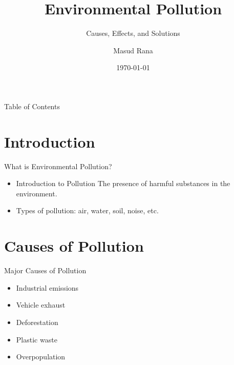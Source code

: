\documentclass{beamer}
\title{Environmental Pollution}
\subtitle{Causes, Effects, and Solutions}
\author{Masud Rana}
\date{\today}
\begin{document}
{
\begin{frame}
  \titlepage
\end{frame}
}


\begin{frame}{Table of Contents}
  \tableofcontents
\end{frame}

\section{Introduction}
\begin{frame}{What is Environmental Pollution?}
  \begin{itemize}
    \item \textcolor{myyellow}{Introduction to Pollution The presence of harmful substances in the environment.}
    \item \textcolor{mygreen}{Types of pollution: air, water, soil, noise, etc.}
  \end{itemize}
\end{frame}

\section{Causes of Pollution}
\begin{frame}{Major Causes of Pollution}
  \begin{itemize}
    \item Industrial emissions
    \item Vehicle exhaust
    \item Deforestation
    \item Plastic waste
    \item Overpopulation
  \end{itemize}
\end{frame}
\end{document}
